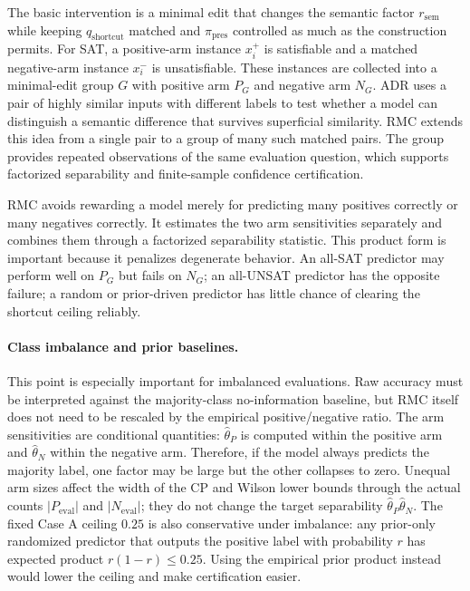 \documentclass[conference]{IEEEtran}
\theoremstyle{remark}
\newcommand{\reasonFac}{r_{\mathrm{sem}}}
\newcommand{\shortcutFac}{q_{\mathrm{shortcut}}}
\newcommand{\presentationFac}{\pi_{\mathrm{pres}}}
\begin{document}
The basic intervention is a minimal edit that changes the semantic factor $\reasonFac$ while keeping $\shortcutFac$ matched and $\presentationFac$ controlled as much as the construction permits.  For SAT, a positive-arm instance $x_i^+$ is satisfiable and a matched negative-arm instance $x_i^-$ is unsatisfiable.  These instances are collected into a minimal-edit group $G$ with positive arm $P_G$ and negative arm $N_G$.  ADR uses a pair of highly similar inputs with different labels to test whether a model can distinguish a semantic difference that survives superficial similarity.  RMC extends this idea from a single pair to a group of many such matched pairs.  The group provides repeated observations of the same evaluation question, which supports factorized separability and finite-sample confidence certification.

RMC avoids rewarding a model merely for predicting many positives correctly or many negatives correctly.  It estimates the two arm sensitivities separately and combines them through a factorized separability statistic.  This product form is important because it penalizes degenerate behavior.  An all-SAT predictor may perform well on $P_G$ but fails on $N_G$; an all-UNSAT predictor has the opposite failure; a random or prior-driven predictor has little chance of clearing the shortcut ceiling reliably.

\paragraph{Class imbalance and prior baselines.}
This point is especially important for imbalanced evaluations.  Raw accuracy must be interpreted against the majority-class no-information baseline, but RMC itself does not need to be rescaled by the empirical positive/negative ratio.  The arm sensitivities are conditional quantities: $\hat\theta_P$ is computed within the positive arm and $\hat\theta_N$ within the negative arm.  Therefore, if the model always predicts the majority label, one factor may be large but the other collapses to zero.  Unequal arm sizes affect the width of the CP and Wilson lower bounds through the actual counts $|P_{\mathrm{eval}}|$ and $|N_{\mathrm{eval}}|$; they do not change the target separability $\hat\theta_P\hat\theta_N$.  The fixed Case A ceiling $0.25$ is also conservative under imbalance: any prior-only randomized predictor that outputs the positive label with probability $r$ has expected product $r(1-r)\leq0.25$.  Using the empirical prior product instead would lower the ceiling and make certification easier.
\end{document}

